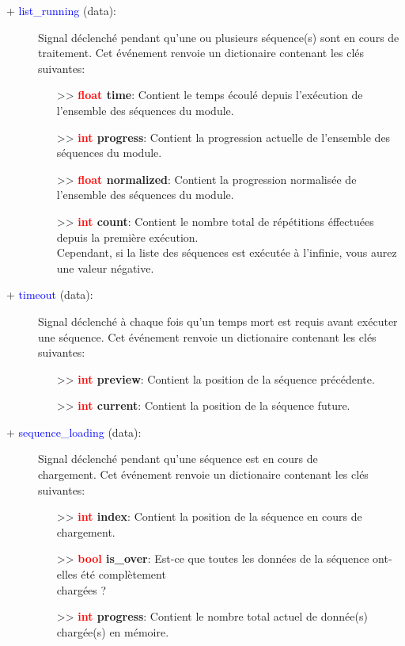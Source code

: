 \documentclass[a4paper, 11pt]{article}
\begin{document}
	\begin{description}
		\item [+ \textcolor{blue}{list\_running} (data):] Signal déclenché pendant qu'une ou plusieurs 
		séquence(s) sont en cours de traitement. Cet événement renvoie un dictionaire contenant les clés 
		suivantes:
		\begin{itemize}
			\item [>> \textbf{\textcolor{red}{float} time}:] Contient le temps écoulé depuis l'exécution de
			l'ensemble des séquences du module.
			\item [>> \textbf{\textcolor{red}{int} progress}:] Contient la progression actuelle de 
			l'ensemble des séquences du module.
			\item [>> \textbf{\textcolor{red}{float} normalized}:] Contient la progression normalisée de 
			l'ensemble des séquences du module.
			\item [>> \textbf{\textcolor{red}{int} count}:] Contient le nombre total de répétitions 
			éffectuées depuis la première exécution. \\Cependant, si la liste des séquences est exécutée à 
			l'infinie, vous aurez une valeur négative.\\
		\end{itemize}
	\end{description}
	\begin{description}
		\item [+ \textcolor{blue}{timeout} (data):] Signal déclenché à chaque fois qu'un temps mort est
		requis avant exécuter une séquence. Cet événement renvoie un dictionaire contenant les clés
		suivantes:
		\begin{itemize}
			\item [>> \textbf{\textcolor{red}{int} preview}:] Contient la position de la séquence
			précédente.
			\item [>> \textbf{\textcolor{red}{int} current}:] Contient la position de la séquence future.\\
		\end{itemize}
	\end{description}
	\begin{description}
		\item [+ \textcolor{blue}{sequence\_loading} (data):] Signal déclenché pendant qu'une séquence est 
		en cours de \\chargement. Cet événement renvoie un dictionaire contenant les clés suivantes:
		\begin{itemize}
			\item [>> \textbf{\textcolor{red}{int} index}:] Contient la position de la séquence en cours de
			chargement.
			\item [>> \textbf{\textcolor{red}{bool} is\_over}:] Est-ce que toutes les données de la séquence
			ont-elles été complètement \\chargées ?
			\item [>> \textbf{\textcolor{red}{int} progress}:] Contient le nombre total actuel de donnée(s)
			chargée(s) en mémoire.\\
		\end{itemize}
	\end{description}
\end{document}
